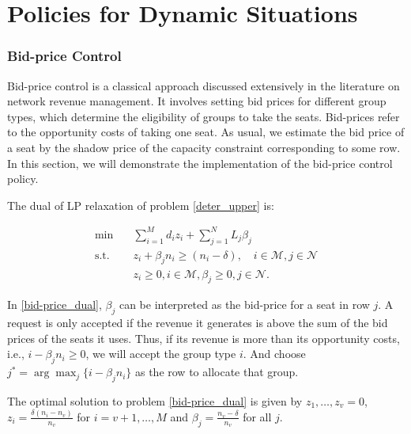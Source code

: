 
\section{Policies for Dynamic Situations}\label{policies}

\subsubsection*{Bid-price Control}
Bid-price control is a classical approach discussed extensively in the literature on network revenue management. It involves setting bid prices for different group types, which determine the eligibility of groups to take the seats. Bid-prices refer to the opportunity costs of taking one seat. As usual, we estimate the bid price of a seat by the shadow price of the capacity constraint corresponding to some row. In this section, we will demonstrate the implementation of the bid-price control policy. 

The dual of LP relaxation of problem \eqref{deter_upper} is:

\begin{equation}\label{bid-price_dual}
  \begin{aligned}
  \min \quad & \sum_{i=1}^{M} d_i z_i + \sum_{j= 1}^{N} L_j \beta_{j} \\
  \text {s.t.} \quad & z_{i} + \beta_j n_i \geq (n_i-\delta), \quad i \in \mathcal{M}, j \in \mathcal{N} \\
  & z_{i} \geq 0, i \in \mathcal{M}, \beta_{j} \geq 0, j \in \mathcal{N}.
  \end{aligned}
\end{equation}

In \eqref{bid-price_dual}, $\beta_{j}$ can be interpreted as the bid-price for a seat in row $j$. A request is only accepted if the revenue it generates is above the sum of the bid prices of the seats it uses. Thus, if its revenue is more than its opportunity costs, i.e., $i -\beta_{j} n_i \geq 0$, we will accept the group type $i$. And choose $j^{*} = \arg \max_{j} \{i -\beta_{j} n_i\}$ as the row to allocate that group.


\begin{lem}\label{bid-price}
 The optimal solution to problem \eqref{bid-price_dual} is given by $z_1 ,\ldots, z_v =0$, $z_{i} = \frac{\delta(n_i-n_v)}{n_v}$ for $i = v+1, \ldots, M$ and $\beta_j = \frac{n_v - \delta}{n_v}$ for all $j$.
\end{lem}

